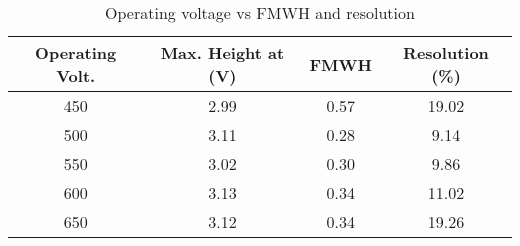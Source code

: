 \begin{table}[H]
    \centering
    \begin{tabular}{|c|c|c|c|}
    \hline
        Operating Volt. & Max. Height at (V) & FMWH & Resolution (\%) \\ \hline
        450 & 2.99 & 0.57 & 19.02 \\ \hline
        500 & 3.11 & 0.28 & 9.14 \\ \hline
        550 & 3.02 & 0.30 & 9.86 \\ \hline
        600 & 3.13 & 0.34 & 11.02 \\ \hline
        650 & 3.12 & 0.34 & 19.26 \\ \hline
    \end{tabular}
    \caption{Operating voltage vs FMWH and resolution}
    \label{tab:resolution}
\end{table}